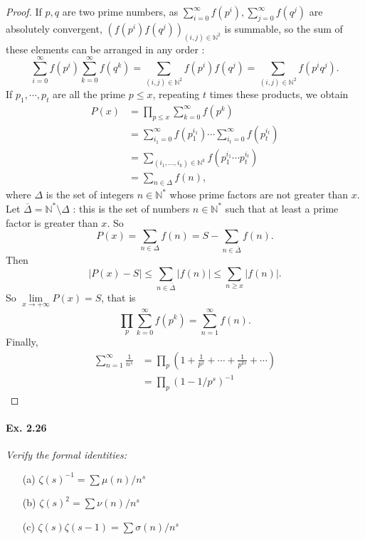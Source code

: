 \documentclass[11pt,a4paper]{article}
\newcommand{\N}{\mathbb{N}}
\begin{document}
{\begin{proof}
If $p, q$ are two prime numbers, as $\sum_{i=0}^\infty f(p^i), \sum_{j=0}^\infty f(q^j)$ are absolutely convergent, $(f(p^i) f(q^j))_{(i,j) \in \N^2}$ is summable, so the sum of these elements can be arranged in any order :
$$ \sum_{i=0}^\infty f(p^i)  \sum_{k=0}^\infty f(q^k) = \sum_{(i,j) \in \N^2} f(p^i) f(q^j) =  \sum_{(i,j) \in \N^2} f(p^iq^j).$$
 If $p_1,\cdots,p_t$ are all the prime $p\leq x$, repeating $t$ times these products, we obtain
\begin{align*}
P(x) & = \prod_{p\leq x }\sum_{k=0}^\infty f(p^k)\\
&= \sum_{i_1=0}^\infty f(p_1^{i_1})\cdots  \sum_{i_t=0}^\infty f(p_t^{i_t})\\
&= \sum_{(i_1,\ldots,i_k)\in \N^k} f(p_1^{i_1} \cdots p_t^{i_t})\\
&=\sum_{n\in \Delta} f(n),
\end{align*}
where $\Delta$ is the set of integers $n \in \N^*$ whose prime factors are not greater than $x$. Let $\overline{\Delta} = \N^* \setminus \Delta$ : this is the set of numbers $n \in \N^*$ such that at least a prime factor is greater than $x$. So
$$P(x) = \sum_{n\in \Delta} f(n)  =  S - \sum_{n \in \overline{\Delta}} f(n).$$
Then
$$\vert P(x) - S \vert \leq \sum_{n\in \overline{\Delta}} \vert f(n) \vert \leq \sum_{n\geq x} \vert f(n) \vert.$$
So $\lim\limits_{x \to + \infty} P(x) = S$, that is
$$\prod_p \sum_{k=0}^\infty f(p^k) = \sum_{n=1}^\infty f(n).$$
Finally, 
\begin{align*}
\sum_{n=1}^\infty \frac{1}{n^s} &=  \prod_p \left ( 1 + \frac{1}{p^s}+ \cdots + \frac{1}{p^{ks}}+ \cdots\right )\\
&=  \prod_p (1-1/p^s)^{-1}
\end{align*}
\end{proof}

\paragraph{Ex. 2.26}

{\it
Verify the formal identities:
\begin{enumerate}
\item[(a)] $\zeta(s)^{-1} = \sum \mu(n)/n^s$
\item[(b)] $\zeta(s)^{2} = \sum \nu(n)/n^s$
\item[(c)]  $\zeta(s)\zeta(s-1) = \sum \sigma(n)/n^s$
\end{enumerate}
}

}
\end{document}
